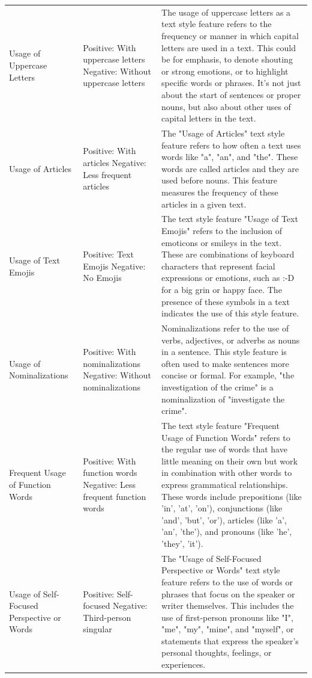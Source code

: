 {{\begin{longtable}{p{4cm} p{4cm} p{6.5cm}}
Usage of Uppercase Letters & Positive: With uppercase letters \newline Negative: Without uppercase letters & The usage of uppercase letters as a text style feature refers to the frequency or manner in which capital letters are used in a text. This could be for emphasis, to denote shouting or strong emotions, or to highlight specific words or phrases. It's not just about the start of sentences or proper nouns, but also about other uses of capital letters in the text. \\
Usage of Articles & Positive: With articles \newline Negative: Less frequent articles & The "Usage of Articles" text style feature refers to how often a text uses words like "a", "an", and "the". These words are called articles and they are used before nouns. This feature measures the frequency of these articles in a given text. \\
Usage of Text Emojis & Positive: Text Emojis \newline Negative: No Emojis & The text style feature "Usage of Text Emojis" refers to the inclusion of emoticons or smileys in the text. These are combinations of keyboard characters that represent facial expressions or emotions, such as :-D for a big grin or happy face. The presence of these symbols in a text indicates the use of this style feature. \\
Usage of Nominalizations & Positive: With nominalizations \newline Negative: Without nominalizations & Nominalizations refer to the use of verbs, adjectives, or adverbs as nouns in a sentence. This style feature is often used to make sentences more concise or formal. For example, "the investigation of the crime" is a nominalization of "investigate the crime". \\
Frequent Usage of Function Words & Positive: With function words \newline Negative: Less frequent function words & The text style feature "Frequent Usage of Function Words" refers to the regular use of words that have little meaning on their own but work in combination with other words to express grammatical relationships. These words include prepositions (like 'in', 'at', 'on'), conjunctions (like 'and', 'but', 'or'), articles (like 'a', 'an', 'the'), and pronouns (like 'he', 'they', 'it'). \\
Usage of Self-Focused Perspective or Words & Positive: Self-focused \newline Negative: Third-person singular & The "Usage of Self-Focused Perspective or Words" text style feature refers to the use of words or phrases that focus on the speaker or writer themselves. This includes the use of first-person pronouns like "I", "me", "my", "mine", and "myself", or statements that express the speaker's personal thoughts, feelings, or experiences. \\

\end{longtable}}}
